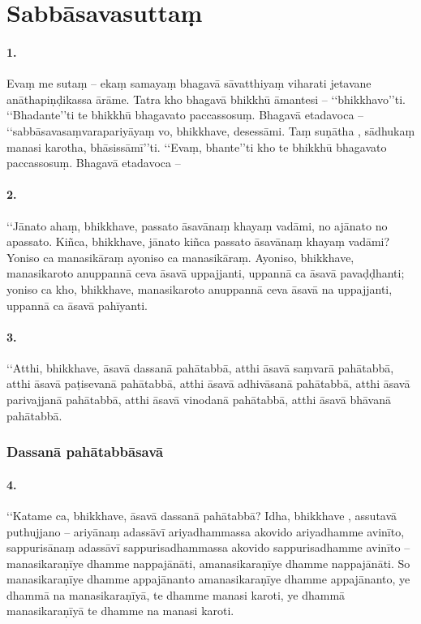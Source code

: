 \section{Sabbāsavasuttaṃ}

\paragraph{1.} Evaṃ me sutaṃ – ekaṃ samayaṃ bhagavā sāvatthiyaṃ viharati jetavane anāthapiṇḍikassa ārāme. Tatra kho bhagavā bhikkhū āmantesi – ‘‘bhikkhavo’’ti. ‘‘Bhadante’’ti te bhikkhū bhagavato paccassosuṃ. Bhagavā etadavoca – ‘‘sabbāsavasaṃvarapariyāyaṃ vo, bhikkhave, desessāmi. Taṃ suṇātha , sādhukaṃ manasi karotha, bhāsissāmī’’ti. ‘‘Evaṃ, bhante’’ti kho te bhikkhū bhagavato paccassosuṃ. Bhagavā etadavoca –

\paragraph{2.} ‘‘Jānato ahaṃ, bhikkhave, passato āsavānaṃ khayaṃ vadāmi, no ajānato no apassato. Kiñca, bhikkhave, jānato kiñca passato āsavānaṃ khayaṃ vadāmi? Yoniso ca manasikāraṃ ayoniso ca manasikāraṃ. Ayoniso, bhikkhave, manasikaroto anuppannā ceva āsavā uppajjanti, uppannā ca āsavā pavaḍḍhanti; yoniso ca kho, bhikkhave, manasikaroto anuppannā ceva āsavā na uppajjanti, uppannā ca āsavā pahīyanti.

\paragraph{3.} ‘‘Atthi, bhikkhave, āsavā dassanā pahātabbā, atthi āsavā saṃvarā pahātabbā, atthi āsavā paṭisevanā pahātabbā, atthi āsavā adhivāsanā pahātabbā, atthi āsavā parivajjanā pahātabbā, atthi āsavā vinodanā pahātabbā, atthi āsavā bhāvanā pahātabbā.

\subsubsection{Dassanā pahātabbāsavā}

\paragraph{4.} ‘‘Katame ca, bhikkhave, āsavā dassanā pahātabbā? Idha, bhikkhave , assutavā puthujjano – ariyānaṃ adassāvī ariyadhammassa akovido ariyadhamme avinīto, sappurisānaṃ adassāvī sappurisadhammassa akovido sappurisadhamme avinīto – manasikaraṇīye dhamme nappajānāti, amanasikaraṇīye dhamme nappajānāti. So manasikaraṇīye dhamme appajānanto amanasikaraṇīye dhamme appajānanto, ye dhammā na manasikaraṇīyā, te dhamme manasi karoti, ye dhammā manasikaraṇīyā te dhamme na manasi karoti.

